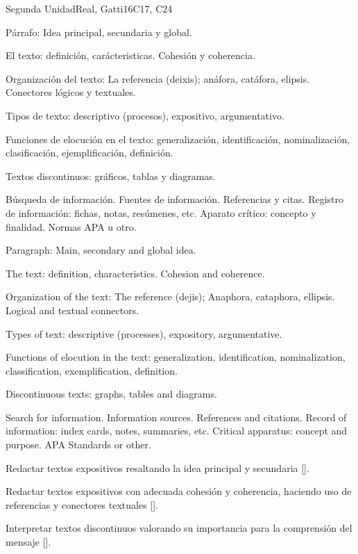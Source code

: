 \begin{syllabus}
\begin{unit}{}{Segunda Unidad}{Real, Gatti}{16}{C17, C24}
\begin{topics}
   \item Párrafo: Idea principal, secundaria y global.
   \item El texto: definición, carácteristicas. Cohesión y coherencia.
   \item Organización del texto: La referencia (deixis); anáfora, catáfora, elipsis. Conectores lógicos y textuales.
   \item Tipos de texto: descriptivo (procesos), expositivo, argumentativo.
   \item Funciones de elocución en el texto: generalización, identificación, nominalización, clasificación,  ejemplificación, definición.
   \item Textos discontinuos: gráficos, tablas y diagramas.
   \item Búsqueda de información. Fuentes de información. Referencias y citas. Registro de información: fichas, notas, resúmenes, etc. Aparato crítico: concepto y finalidad. Normas APA u otro.

   \item Paragraph: Main, secondary and global idea.
   \item The text: definition, characteristics. Cohesion and coherence.
   \item Organization of the text: The reference (dejis); Anaphora, cataphora, ellipsis. Logical and textual connectors.
   \item Types of text: descriptive (processes), expository, argumentative.
   \item Functions of elocution in the text: generalization, identification, nominalization, classification, exemplification, definition.
   \item Discontinuous texts: graphs, tables and diagrams.
   \item Search for information. Information sources. References and citations. Record of information: index cards, notes, summaries, etc. Critical apparatus: concept and purpose. APA Standards or other.
\end{topics}
\begin{learningoutcomes}
   \item Redactar textos expositivos resaltando la idea principal y secundaria [\Usage].
   \item Redactar textos expositivos con adecuada cohesión y coherencia, haciendo uso de referencias y conectores textuales [\Usage].
   \item Interpretar textos discontinuos  valorando su importancia para la comprensión del mensaje [\Usage].


\end{learningoutcomes}
\end{unit}
\end{syllabus}
